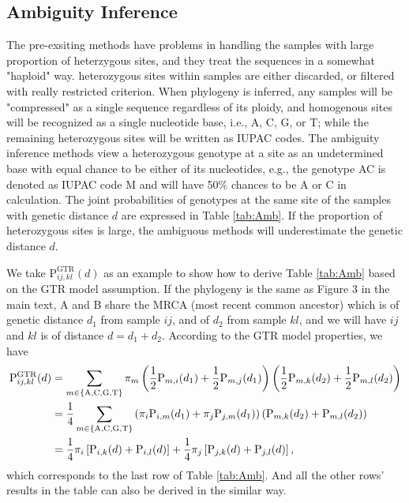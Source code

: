\documentclass{article}
\begin{document}
\subsection{Ambiguity Inference}
The pre-exsiting methods have problems in handling the samples with large proportion of heterzygous sites, and they treat the sequences in a somewhat
"haploid" way. heterozygous sites within samples are either discarded, or filtered with really restricted criterion. When phylogeny is inferred, any samples will be "compressed" as a single sequence regardless of its ploidy, and homogenous sites will be recognized as a single nucleotide base, i.e., A, C, G, or T; while the remaining heterozygous sites will be written as IUPAC codes. The ambiguity inference methods view a heterozygous genotype at a site as an undetermined base with equal chance to be either of its nucleotides, e.g., the genotype AC is denoted as IUPAC code M and will have 50\% chances to be A or C in calculation. The joint probabilities of genotypes at the same site of the samples with genetic distance $d$ are expressed in Table \ref{tab:Amb}. If the proportion of heterozygous sites is large, the ambiguous methods will underestimate the genetic distance $d$. 

We take $\mathrm{P}_{ij,kl}^{\mathrm{GTR}}(d)$ as an example to show how to derive Table \ref{tab:Amb} based on the GTR model assumption. If the phylogeny is the same as Figure 3 in the main text, A and B share the MRCA (most recent common ancestor) which is of genetic distance $d_1$ from sample $ij$, and of $d_2$ from sample $kl$, and we will have $ij$ and $kl$ is of distance $d = d_1+d_2$. According to the GTR model properties, we have
\begin{align*}
    \mathrm{P}_{ij,kl}^{\mathrm{GTR}}(d)&=\sum_{m\in\{{\rm A,C,G,T}\}}\pi_{m}\left(\frac{1}{2}\mathrm{P}_{m,i}(d_1)+\frac{1}{2}\mathrm{P}_{m,j}(d_1)\right)\left(\frac{1}{2}\mathrm{P}_{m,k}(d_2)+\frac{1}{2}\mathrm{P}_{m,l}(d_2)\right)\\
    &=\frac{1}{4}\sum_{m\in\{{\rm A,C,G,T}\}}\left(\pi_i\mathrm{P}_{i,m}(d_1)+\pi_j\mathrm{P}_{j,m}(d_1)\right)\left(\mathrm{P}_{m,k}(d_2)+\mathrm{P}_{m,l}(d_2)\right)\\
    &=\frac{1}{4}\mathrm{\pi}_i\left[\mathrm{P}_{i,k}(d)+\mathrm{P}_{i,l}(d)\right]+\frac{1}{4}\mathrm{\pi}_j\left[\mathrm{P}_{j,k}(d)+\mathrm{P}_{j,l}(d)\right],
\end{align*}
which corresponds to the last row of Table \ref{tab:Amb}. And all the other rows' results in the table can also be derived in the similar way. 
\end{document}
